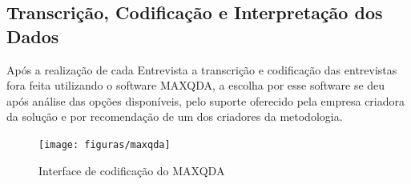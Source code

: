\subsection{Transcrição, Codificação e Interpretação dos Dados}
\label{subsection:codificacao_e_interpretacao_dos_dados}

Após a realização de cada Entrevista a transcrição e codificação das entrevistas fora feita utilizando o software MAXQDA, a escolha por esse software se deu após análise das opções disponíveis, pelo suporte oferecido pela empresa criadora da solução e por recomendação de um dos criadores da metodologia.

\begin{figure}[!htb]
	\centering
	\texttt{[image: figuras/maxqda]}
	\caption{Interface de codificação do MAXQDA}
	\label{figure:maxqda}
\end{figure}